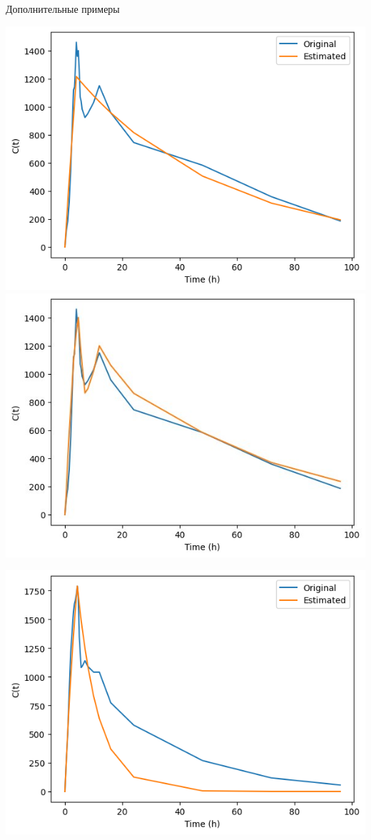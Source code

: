 \documentclass[12pt]{beamer}
\begin{document}
\begin{frame}{Дополнительные примеры}
	\begin{minipage}{0.45\linewidth}
		\centering
		\includegraphics[width=\linewidth]{results/basic_3.png}
		\includegraphics[width=\linewidth]{results/3.jpg}
	\end{minipage}
	\begin{minipage}{0.45\linewidth}
		\centering
		\includegraphics[width=\linewidth]{results/basic_4.png}

\end{minipage}
\end{frame}
\end{document}
